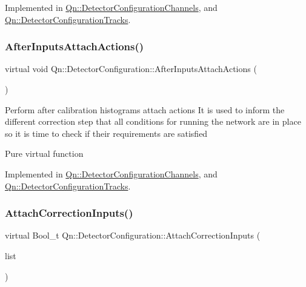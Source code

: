 Implemented in \mbox{\hyperlink{classQn_1_1DetectorConfigurationChannels_a1f22484e703888f5ff9548d9a8421d3b}{Qn\+::\+Detector\+Configuration\+Channels}}, and \mbox{\hyperlink{classQn_1_1DetectorConfigurationTracks_a0bfa5af566c04893c1c673ddcae7a7c5}{Qn\+::\+Detector\+Configuration\+Tracks}}.

\mbox{\label{classQn_1_1DetectorConfiguration_ab6766905dffe5811aefa59dd1e1117d8}} 
\subsubsection{\texorpdfstring{After\+Inputs\+Attach\+Actions()}{AfterInputsAttachActions()}}
{\footnotesize\ttfamily virtual void Qn\+::\+Detector\+Configuration\+::\+After\+Inputs\+Attach\+Actions (\begin{DoxyParamCaption}{ }\end{DoxyParamCaption})\hspace{0.3cm}{\ttfamily [pure virtual]}}

Perform after calibration histograms attach actions It is used to inform the different correction step that all conditions for running the network are in place so it is time to check if their requirements are satisfied

Pure virtual function 

Implemented in \mbox{\hyperlink{classQn_1_1DetectorConfigurationChannels_aee41ab7c778ea075aa7e4f414c8817e0}{Qn\+::\+Detector\+Configuration\+Channels}}, and \mbox{\hyperlink{classQn_1_1DetectorConfigurationTracks_af7f3db92b08c789136fdc0ab97e6576e}{Qn\+::\+Detector\+Configuration\+Tracks}}.

\mbox{\label{classQn_1_1DetectorConfiguration_a4ae0eb587070e68a11fbb438d96fca15}} 
\subsubsection{\texorpdfstring{Attach\+Correction\+Inputs()}{AttachCorrectionInputs()}}
{\footnotesize\ttfamily virtual Bool\+\_\+t Qn\+::\+Detector\+Configuration\+::\+Attach\+Correction\+Inputs (\begin{DoxyParamCaption}\item[{T\+List $\ast$}]{list }\end{DoxyParamCaption})\hspace{0.3cm}{\ttfamily [pure virtual]}}

